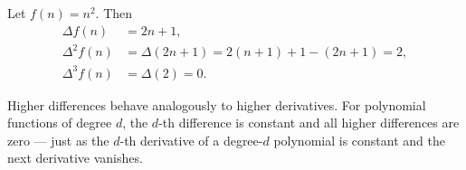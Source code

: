 \begin{example*}
Let \(f(n) = n^2\). Then
\[
\begin{aligned}
\Delta f(n) &= 2n + 1,\\
\Delta^2 f(n) &= \Delta(2n+1) = 2(n+1)+1 - (2n+1) = 2,\\
\Delta^3 f(n) &= \Delta(2) = 0.
\end{aligned}
\]
\end{example*}

\begin{remark*}[Interpretation]
Higher differences behave analogously to higher derivatives.
For polynomial functions of degree \(d\), the \(d\)-th difference is
constant and all higher differences are zero --- just as the \(d\)-th
derivative of a degree-\(d\) polynomial is constant and the next
derivative vanishes.
\end{remark*}
